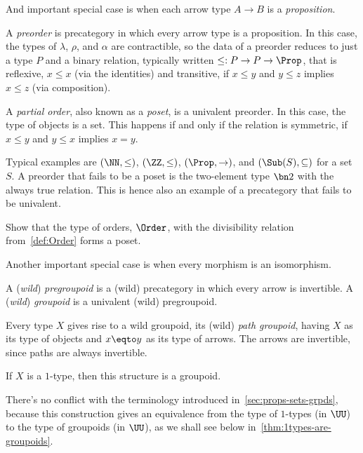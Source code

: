 And important special case is when each arrow type $A \to B$ is a \emph{proposition}.
\begin{example}\label{ex:poset}
  A \emph{preorder} is precategory in which every arrow type is a proposition.
  In this case, the types of $\lambda$, $\rho$, and $\alpha$ are contractible, so the data
  of a preorder reduces to just a type $P$ and a binary relation,
  typically written $\le : P \to P \to \Prop$,
  that is reflexive, $x \le x$ (via the identities)
  and transitive, \ie if $x\le y$ and $y\le z$ implies $x\le z$ (via composition).

  A \emph{partial order}, also known as a \emph{poset},
  is a univalent preorder.
  In this case, the type of objects is a set.
  This happens if and only if the relation is symmetric,
  \ie if $x \le y$ and $y \le x$ implies $x = y$.

  Typical examples are $(\NN,\le)$, $(\ZZ,\le)$, $(\Prop,\to)$,
  and $(\Sub(S),\subseteq)$ for a set $S$.
  A preorder that fails to be a poset is the two-element type $\bn 2$
  with the always true relation.
  This is hence also an example of a precategory that fails to be univalent.
\end{example}

\begin{xca}\label{xca:order-poset}
  Show that the type of orders, $\Order$,
  with the divisibility relation from~\cref{def:Order} forms a poset.
\end{xca}

Another important special case is when every morphism is an isomorphism.
\begin{definition}\label{def:wild-pre-groupoid}
  A (\emph{wild}) \emph{pregroupoid} is a (wild) precategory in which every
  arrow is invertible.
  A (\emph{wild}) \emph{groupoid} is a univalent (wild) pregroupoid.
\end{definition}

\begin{example}\label{ex:path-groupoid}
  Every type $X$ gives rise to a wild groupoid, its (wild) \emph{path groupoid},
  having $X$ as its type of objects and $x \eqto y$ as its type of arrows.
  The arrows are invertible, since paths are always invertible.

  If $X$ is a $1$-type, then this structure is a groupoid.
\end{example}
There's no conflict with the terminology introduced in~\cref{sec:props-sets-grpds},
because this construction gives an equivalence
from the type of $1$-types (in $\UU$) to the type of groupoids (in $\UU$),
as we shall see below in~\cref{thm:1types-are-groupoids}.

